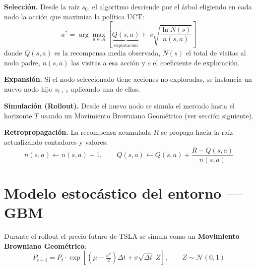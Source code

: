 \documentclass[11pt, a4paper]{article}
\newcommand{\highlight}[2][acc1]{\textcolor{#1}{\textbf{#2}}}
\begin{document}
\vspace{0.3em}
\begin{tcolorbox}[darkcard=acc2, title={Las cuatro fases en detalle}]

\textbf{\color{acc1}\faSearch\; Selección.}
Desde la raíz $s_0$, el algoritmo desciende por el árbol eligiendo en
cada nodo la acción que maximiza la política UCT:
\[
  a^* = \arg\max_{a \in A}
    \left[
      \underbrace{Q(s,a)}_{\text{explotación}}
      +\; c\sqrt{\dfrac{\ln N(s)}{n(s,a)}}
    \right]
\]
donde $Q(s,a)$ es la recompensa media observada, $N(s)$ el total de
visitas al nodo padre, $n(s,a)$ las visitas a esa acción y $c$ el
coeficiente de exploración.

\medskip
\textbf{\color{acc2}\faPlus\; Expansión.}
Si el nodo seleccionado tiene acciones no exploradas, se instancia un
nuevo nodo hijo $s_{t+1}$ aplicando una de ellas.

\medskip
\textbf{\color{acc3}\faDice\; Simulación (Rollout).}
Desde el nuevo nodo se simula el mercado hasta el horizonte $T$ usando
un Movimiento Browniano Geométrico (ver sección siguiente).

\medskip
\textbf{\color{acc4}\faArrowUp\; Retropropagación.}
La recompensa acumulada $R$ se propaga hacia la raíz actualizando
contadores y valores:
\[
  n(s,a) \leftarrow n(s,a)+1,\qquad
  Q(s,a) \leftarrow Q(s,a) + \frac{R - Q(s,a)}{n(s,a)}
\]
\end{tcolorbox}

\section{Modelo estocástico del entorno — GBM}

Durante el rollout el precio futuro de TSLA se simula como un
\highlight[acc3]{Movimiento Browniano Geométrico}:
\[
  P_{t+1} = P_t \cdot \exp\!\left[
    \left(\mu - \tfrac{\sigma^2}{2}\right)\Delta t
    + \sigma\sqrt{\Delta t}\; Z
  \right],\qquad Z \sim \mathcal{N}(0,1)
\]
\end{document}
